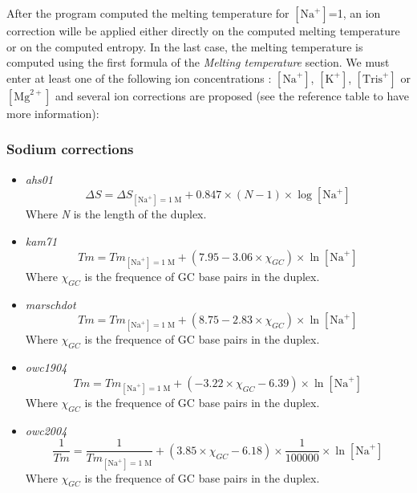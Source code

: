 \documentclass{article}
\begin{document}
After the program computed the melting temperature for $[\mbox{Na}^+]$=1, an ion correction wille be applied
either directly on the computed melting temperature or on the computed entropy. In the last case, the melting
temperature is computed using the first formula of the \textit{Melting temperature} section.
We must enter at least one of the following ion concentrations : $[\mbox{Na}^+]$, $[\mbox{K}^+]$, $[\mbox{Tris}^+]$ or
$[\mbox{Mg}^{2+}]$ and several ion corrections are proposed  (see the reference table to have more information):

\subsubsection{Sodium corrections}
 \begin{itemize}
 \item \textit{ahs01}
 \begin{displaymath}
  \Delta{}S=\Delta{}S_{[\mbox{Na}^+]=1\;\mathrm{M}}+0.847 \times (N - 1) \times \log [\mbox{Na}^+]   
 \end{displaymath}
 Where \emph{N} is the length of the duplex.
 \item \textit{kam71}
 \begin{displaymath}
  Tm=Tm_{[\mbox{Na}^+]=1\;\mathrm{M}}+(7.95 - 3.06 \times \chi_{GC}) \times \ln [\mbox{Na}^+]  
 \end{displaymath}
 Where \emph{$\chi_{GC}$} is the frequence of GC base pairs in the duplex.
 \item \textit{marschdot}
 \begin{displaymath}
  Tm=Tm_{[\mbox{Na}^+]=1\;\mathrm{M}}+ (8.75 - 2.83 \times \chi_{GC}) \times \ln [\mbox{Na}^+]  
 \end{displaymath}
 Where \emph{$\chi_{GC}$} is the frequence of GC base pairs in the duplex.
 \item \textit{owc1904}
 \begin{displaymath}
  Tm=Tm_{[\mbox{Na}^+]=1\;\mathrm{M}}+ (-3.22 \times \chi_{GC} - 6.39) \times \ln [\mbox{Na}^+]  
 \end{displaymath}
 Where \emph{$\chi_{GC}$} is the frequence of GC base pairs in the duplex.
 \item \textit{owc2004}
 \begin{displaymath}
 \frac{1}{Tm}=\frac{1}{Tm_{[\mbox{Na}^+]=1\;\mathrm{M}}}+ (3.85 \times \chi_{GC} - 6.18) \times \frac{1}{100000} \times \ln [\mbox{Na}^+]  
 \end{displaymath}
 Where \emph{$\chi_{GC}$} is the frequence of GC base pairs in the duplex.

\end{itemize}
\end{document}
